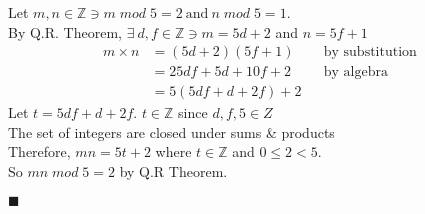 \documentclass[12pt]{article}
\newcommand{\Z}{\mathbb{Z}}
\renewcommand{\qed}{\hfill$\blacksquare$}
\renewenvironment{proof}{\begin{addmargin}[1em]{0em}\begin{newproof}}{\end{newproof}\end{addmargin}\qed}
\begin{document}
\begin{proof}
	Let $m, n \in \Z \ni m \; mod \; 5 = 2 \: \text{and} \: n \; mod \; 5 = 1$. \\
	By Q.R. Theorem, $\exists \: d,f \in \Z \ni m = 5d+2$ and $n = 5f+1$
	\begin{align*}
		m \times n & = (5d+2)(5f+1)        &  & \text{by substitution} \\
		           & = 25df + 5d + 10f + 2 &  & \text{by algebra}      \\
		           & = 5(5df+d+2f) + 2
	\end{align*}
	Let $t = 5df+d+2f$. $t \in \Z$ since $d,f,5 \in Z$ \\
	The set of integers are closed under sums \& products \\
	Therefore, $mn = 5t + 2$ where $t \in \Z$ and $0 \le 2 < 5$. \\
	So $mn \; mod \; 5 = 2 $ by Q.R Theorem.
\end{proof}

\end{document}
